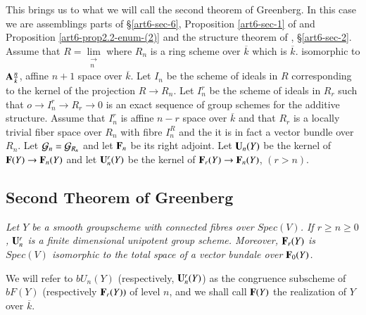 This brings us to what we will call the second theorem of Greenberg. In this case we are assemblings parts of \S \ref{art6-sec-6}, Proposition \ref{art6-sec-1} of \cite{art6-keyMG I} and Proposition \ref{art6-prop2.2-enum-(2)} and the structure theorem of \cite{art6-keyMG II}, \S \ref{art6-sec-2}. Assume that $R= \lim\limits_{\substack{\longrightarrow \\n}}$ where $R_{n}$ is a ring scheme over $\overline{k}$ which is $\overline{k}$. isomorphic to $\mathbf{A}\frac{n}{k}$, affine $n+1$ space over $\overline{k}$. Let $I_{n}$ be the scheme of ideals in $R$ corresponding to the kernel of the projection $R \rightarrow R_{n}$. Let $I_{n}^{r}$ be the scheme of ideals in $R_{r}$ such that $o\rightarrow I_{n}^{r} \rightarrow R_{r}\rightarrow 0$ is an exact sequence of group schemes for the additive structure. Assume that $I_{n}^{r}$ is affine $n-r$ space over $\overline{k}$ and that $R_{r}$ is a locally trivial fiber space over $R_{n}$ with fibre $I_{n}^{R}$ and the it is in fact a vector bundle over $R_{n}$. Let $\mathcal{G}_{n} = \mathcal{G}_{R_{n}}$ and let $\mathbf{F}_{n}$ be its right adjoint. Let $\mathbf{U}_{n}(Y)$ be the kernel of $\mathbf{F}(Y) \rightarrow \mathbf{F}_{n}(Y)$ and let $\mathbf{U}_{n}^{r}(Y)$ be the kernel of $\mathbf{F}_{r}(Y) \rightarrow \mathbf{F}_{n}(Y)$, $(r > n)$. 

\subsection{Second Theorem of Greenberg}\label{art6-subsec-12.2}
\textit{Let $Y$ be a smooth group\break scheme with connected fibres over $Spec(V)$. If $r \geq n \geq 0$, $\mathbf{U}_{n}^{r}$ is a finite dimensional unipotent group scheme.  Moreover, $\mathbf{F}_{r}(Y)$ is $Spec(V)$ isomorphic to the total space of a vector bundale over $\mathbf{F}_{0}(Y)$.}

We will refer to $bU_{n}(Y)$ (respectively, $\mathbf{U}_{n}^{r}(Y)$) as the congruence subscheme of $bF(Y)$ (respectively $\mathbf{F}_{r}(Y))$ of level $n$, and we shall call $\mathbf{F}(Y)$ the realization of $Y$ over $\overline{k}$.

